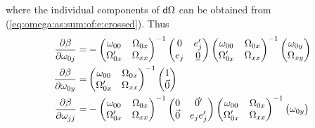 \documentclass[11pt]{asaproc}
\newcommand{\diff}{{\sf d}}
\begin{document}
where the individual components of $\diff\Omega$ can be obtained from
(\ref{eq:omega:as:sum:of:e:crossed}).
Thus
\begin{align}
    \frac{\partial\beta}{\partial\omega_{0j}} = &
        -
        \begin{pmatrix}
            \omega_{00} & \Omega_{0x} \\
            \Omega_{0x}' & \Omega_{xx}
        \end{pmatrix}^{-1}
        \begin{pmatrix}
            0 & e_j' \\
            e_j & \underline{0}
        \end{pmatrix}
        \begin{pmatrix}
            \omega_{00} & \Omega_{0x} \\
            \Omega_{0x}' & \Omega_{xx}
        \end{pmatrix}^{-1}
        \begin{pmatrix}
            \omega_{0y} \\
            \Omega_{xy}
        \end{pmatrix}
    \notag \\
    \frac{\partial\beta}{\partial\omega_{0y}} = &
    \begin{pmatrix}
        \omega_{00} & \Omega_{0x} \\
        \Omega_{0x}' & \Omega_{xx}
    \end{pmatrix}^{-1}
    \begin{pmatrix}
        1 \\
        \vec{0}
    \end{pmatrix}
    \notag \\
    \frac{\partial\beta}{\partial\omega_{jj}} = &
    -
    \begin{pmatrix}
        \omega_{00} & \Omega_{0x} \\
        \Omega_{0x}' & \Omega_{xx}
    \end{pmatrix}^{-1}
    \begin{pmatrix}
        0 & \vec{0}' \\
        \vec{0} & e_j e_j'
    \end{pmatrix}
    \begin{pmatrix}
        \omega_{00} & \Omega_{0x} \\
        \Omega_{0x}' & \Omega_{xx}
    \end{pmatrix}^{-1}
    \begin{pmatrix}
        \omega_{0y} \\

\end{pmatrix}
\end{align}
\end{document}
